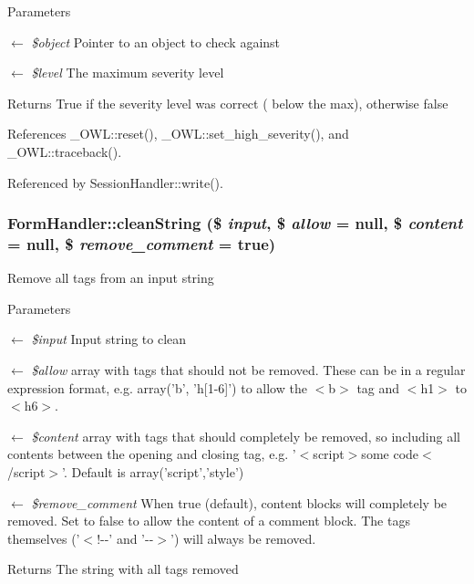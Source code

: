 \begin{DoxyParams}{Parameters}
\item[\mbox{$\leftarrow$} {\em \$object}]Pointer to an object to check against \item[\mbox{$\leftarrow$} {\em \$level}]The maximum severity level \end{DoxyParams}
\begin{DoxyReturn}{Returns}
True if the severity level was correct ( below the max), otherwise false 
\end{DoxyReturn}


References \_\-OWL::reset(), \_\-OWL::set\_\-high\_\-severity(), and \_\-OWL::traceback().



Referenced by SessionHandler::write().

\subsubsection[{cleanString}]{\setlength{\rightskip}{0pt plus 5cm}FormHandler::cleanString (\$ {\em input}, \/  \$ {\em allow} = {\ttfamily null}, \/  \$ {\em content} = {\ttfamily null}, \/  \$ {\em remove\_\-comment} = {\ttfamily true})}\label{classFormHandler_a5ee0cda14dcbe0b6e12226db4bd951a0}
Remove all tags from an input string 
\begin{DoxyParams}{Parameters}
\item[\mbox{$\leftarrow$} {\em \$input}]Input string to clean \item[\mbox{$\leftarrow$} {\em \$allow}]array with tags that should not be removed. These can be in a regular expression format, e.g. array('b', 'h\mbox{[}1-\/6\mbox{]}') to allow the $<$b$>$ tag and $<$h1$>$ to $<$h6$>$. \item[\mbox{$\leftarrow$} {\em \$content}]array with tags that should completely be removed, so including all contents between the opening and closing tag, e.g. '$<$script$>$some code$<$/script$>$'. Default is array('script','style') \item[\mbox{$\leftarrow$} {\em \$remove\_\-comment}]When true (default), content blocks will completely be removed. Set to false to allow the content of a comment block. The tags themselves ('$<$!-\/-\/' and '-\/-\/$>$') will always be removed. \end{DoxyParams}
\begin{DoxyReturn}{Returns}
The string with all tags removed 
\end{DoxyReturn}


